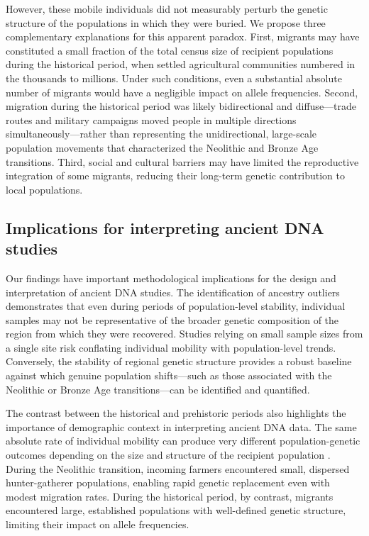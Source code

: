\documentclass[11pt,a4paper]{article}
\begin{document}
However, these mobile individuals did not measurably perturb the genetic structure of the populations in which they were buried. We propose three complementary explanations for this apparent paradox. First, migrants may have constituted a small fraction of the total census size of recipient populations during the historical period, when settled agricultural communities numbered in the thousands to millions. Under such conditions, even a substantial absolute number of migrants would have a negligible impact on allele frequencies. Second, migration during the historical period was likely bidirectional and diffuse---trade routes and military campaigns moved people in multiple directions simultaneously---rather than representing the unidirectional, large-scale population movements that characterized the Neolithic and Bronze Age transitions. Third, social and cultural barriers may have limited the reproductive integration of some migrants, reducing their long-term genetic contribution to local populations.

\subsection{Implications for interpreting ancient DNA studies}
Our findings have important methodological implications for the design and interpretation of ancient DNA studies. The identification of ancestry outliers demonstrates that even during periods of population-level stability, individual samples may not be representative of the broader genetic composition of the region from which they were recovered. Studies relying on small sample sizes from a single site risk conflating individual mobility with population-level trends. Conversely, the stability of regional genetic structure provides a robust baseline against which genuine population shifts---such as those associated with the Neolithic or Bronze Age transitions---can be identified and quantified.

The contrast between the historical and prehistoric periods also highlights the importance of demographic context in interpreting ancient DNA data. The same absolute rate of individual mobility can produce very different population-genetic outcomes depending on the size and structure of the recipient population \citep{patterson2012ancient}. During the Neolithic transition, incoming farmers encountered small, dispersed hunter-gatherer populations, enabling rapid genetic replacement even with modest migration rates. During the historical period, by contrast, migrants encountered large, established populations with well-defined genetic structure, limiting their impact on allele frequencies.
\end{document}
